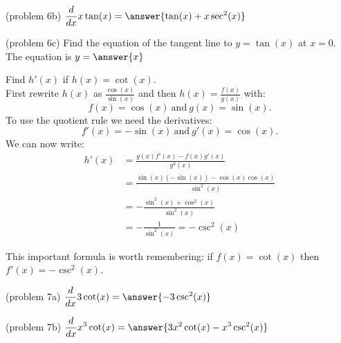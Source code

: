 \documentclass{ximera}
\begin{document}
\begin{problem}(problem 6b)
  $\displaystyle{\frac{d}{dx} x\tan(x)= \answer{\tan(x) + x\sec^2(x)}}$\\
\end{problem}

\begin{problem}(problem 6c)
  Find the equation of the tangent line to $y = \tan(x)$ at $x = 0$.\\
  The equation is $y = \answer{x}$
\end{problem}

\begin{example}[example 7]
Find $h'(x)$ if $h(x) = \cot(x)$.\\
First rewrite $h(x)$ as $\displaystyle{\frac{\cos(x)}{\sin(x)}}$ and then 
$\displaystyle{h(x) = \frac{f(x)}{g(x)}}$ with:
\[f(x) = \cos(x) \ \text{and} \  g(x)= \sin(x).\]
To use the quotient rule we need the derivatives:
\[f'(x) = -\sin(x) \ \text{and} \  g'(x) =\cos(x).\]
We can now write: 
\begin{align*}
h'(x) &= \frac{g(x)f'(x) - f(x)g'(x)}{g^2(x)}\\
&= \frac{\sin(x)(-\sin(x)) -\cos(x)\cos(x) }{\sin^2(x)}\\
&= -\frac{\sin^2(x)+ \cos^2(x)}{\sin^2(x)}\\
&= -\frac{1}{\sin^2(x)} = -\csc^2(x)
\end{align*}

This important formula is worth remembering: if $f(x) = \cot(x)$ then $f'(x) =-\csc^2(x)$.
\end{example}



\begin{center}
\begin{foldable}
\end{foldable}
\end{center}


\begin{problem}(problem 7a)
  $\displaystyle{\frac{d}{dx} 3\cot(x)= \answer{-3\csc^2(x)}}$\\
\end{problem}

\begin{problem}(problem 7b)
  $\displaystyle{\frac{d}{dx} x^3\cot(x)= \answer{3x^2\cot(x) - x^3\csc^2(x)}}$\\
\end{problem}
\end{document}
